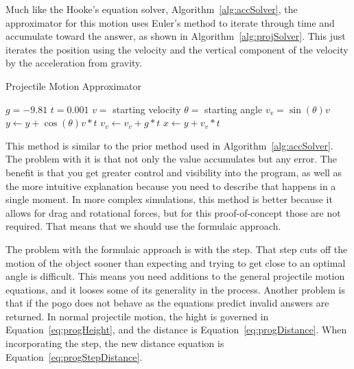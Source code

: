 \documentclass[12pt, letterpaper]{article}
\newcommand{\poses}[1]{#1's}
\begin{document}
Much like the \poses{Hooke} equation solver, Algorithm~\ref{alg:accSolver}, the approximator for this motion
uses \poses{Euler} method to iterate through time and accumulate toward the answer, as shown in
Algorithm~\ref{alg:projSolver}. This just iterates the position using the velocity and the vertical 
component of the velocity by the acceleration from gravity.

\begin{algorithm}
\caption{Projectile Motion Approximator}
\begin{algorithmic} 
\label{alg:projSolver}
\REQUIRE $g = -9.81$
\REQUIRE $t = 0.001$
\REQUIRE $v =$ starting velocity
\REQUIRE $\theta =$ starting angle
\REQUIRE $v_v = \sin(\theta) v$
\STATE $y \leftarrow  y + \cos(\theta) v * t$
\STATE $v_v \leftarrow  v_v + g * t$
\STATE $x \leftarrow  y + v_v * t$
\ENDWHILE
\end{algorithmic}
\end{algorithm}

This method is similar to the prior method used in Algorithm~\ref{alg:accSolver}. The problem with it is that
not only the value accumulates but any error. The benefit is that you get greater control and visibility into
the program, as well as the more intuitive explanation because you need to describe that happens in a single
moment. In more complex simulations, this method is better because it allows for drag and rotational forces,
but for this proof-of-concept those are not required. That means that we should use the formulaic approach.

The problem with the formulaic approach is with the step. That step cuts off the motion of the object sooner
than expecting and trying to get close to an optimal angle is difficult. This means you need additions to the
general projectile motion equations, and it looses some of its generality in the process. Another problem is
that if the pogo does not behave as the equations predict invalid answers are returned. In normal projectile
motion, the hight is governed in Equation~\ref{eq:progHeight}, and the distance is 
Equation~\ref{eq:progDistance}. When incorporating the step, the new distance equation is
Equation~\ref{eq:progStepDistance}.
\end{document}
